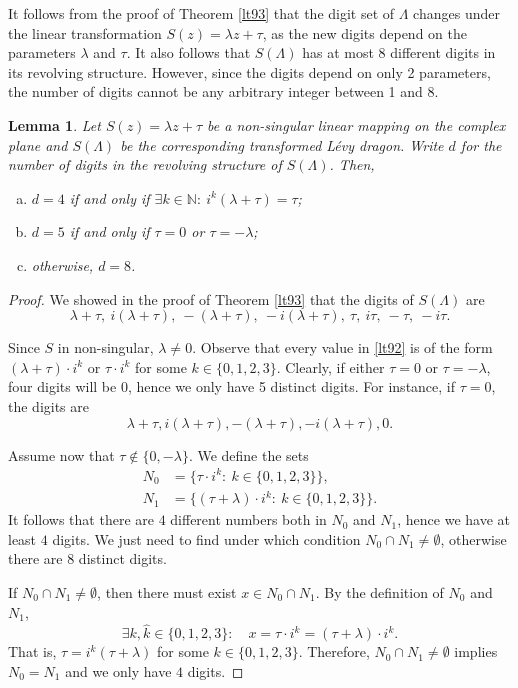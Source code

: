 \documentclass[12pt, a4paper]{amsart}
\newtheorem{lemma}[theorem]{Lemma}
\numberwithin{equation}{section}
\numberwithin{theorem}{section}
\begin{document}
It follows from the proof of Theorem \ref{lt93} that the digit set of $\Lambda$ changes under the linear transformation $S(z)=\lambda z+\tau$, as the new digits depend on the parameters $\lambda$ and $\tau$. It also follows that $S(\Lambda)$ has at most 8 different digits in its revolving structure. However, since the digits depend on only 2 parameters, the number of digits cannot be any arbitrary integer between 1 and 8.
\begin{lemma}\label{lt90}
  Let $S(z)=\lambda z+\tau$ be a non-singular linear mapping on the complex plane and $S(\Lambda)$ be the corresponding transformed L\'evy dragon. Write $d$ for the number of digits in the revolving structure of $S(\Lambda)$. Then, 
  \begin{enumerate}[(a)]
    \item $d=4$ if and only if $\exists k\in\mathbb{N}:\: i^k(\lambda+\tau)=\tau$;
    \item $d=5$ if and only if $\tau=0$ or $\tau=-\lambda$;
    \item otherwise, $d=8$. 
  \end{enumerate}

\end{lemma}

\begin{proof}
  We showed in the proof of Theorem \ref{lt93} that the digits of $S(\Lambda)$ are 
  \begin{equation}\label{lt92}
      \lambda+\tau,\: i(\lambda+\tau),\: -(\lambda+\tau),\: -i(\lambda+\tau),\: 
      \tau,\: i\tau,\: -\tau,\: -i\tau.
  \end{equation}

  Since $S$ in non-singular, $\lambda\neq 0$. Observe that every value in \eqref{lt92} is of the form $(\lambda+\tau)\cdot i^k$ or $\tau\cdot i^k$ for some $k\in\{0,1,2,3\}$. Clearly, if either $\tau=0$ or $\tau=-\lambda$, four digits will be 0, hence we only have 5 distinct digits.
  For instance, if $\tau=0$, the digits are 
  \[
        \lambda+\tau, i(\lambda+\tau), -(\lambda+\tau), -i(\lambda+\tau), 0.
  \]

  Assume now that $\tau\not\in\{0,-\lambda\}$. We define the sets 
  \begin{align*}
    N_0 &=\bigg\{\tau\cdot i^k:\: k\in\{0,1,2,3\}\bigg\}, \\
    N_1 &=\bigg\{(\tau+\lambda)\cdot i^k:\: k\in\{0,1,2,3\}\bigg\}.
  \end{align*}
  It follows that there are $4$ different numbers both in $N_0$ and $N_1$, hence we have at least $4$ digits. We just need to find under which condition $N_0\cap N_1\neq\emptyset$, otherwise there are $8$ distinct digits.

  If $N_0\cap N_1\neq\emptyset$, then there must exist $x\in N_0\cap N_1$. By the definition of $N_0$ and $N_1$, 
  \[
    \exists k, \widehat{k}\in\{0,1,2,3\}: \quad 
    x= \tau\cdot i^k= (\tau+\lambda)\cdot i^{\widehat{k}}.
  \]
  That is, $\tau=i^k(\tau+\lambda)$ for some $k\in\{0,1,2,3\}$. Therefore, $N_0\cap N_1\neq\emptyset$ implies $N_0= N_1$ and we only have $4$ digits. 
  
\end{proof}
\end{document}
